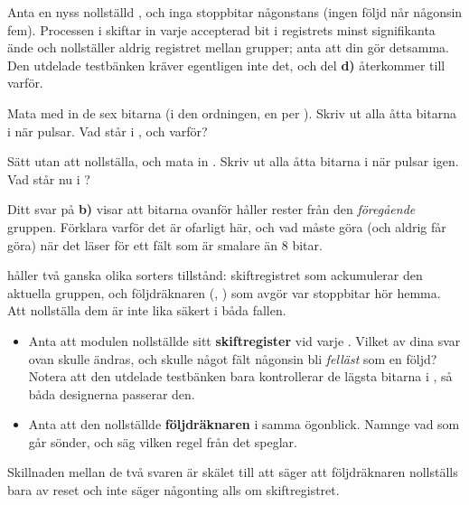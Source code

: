 Anta en nyss nollställd ,  och inga stoppbitar någonstans
(ingen följd når någonsin fem). Processen i  skiftar in varje accepterad bit
i registrets minst signifikanta ände och nollställer aldrig registret mellan grupper; anta att din
gör detsamma. Den utdelade testbänken kräver egentligen inte det, och del \textbf{d)} återkommer
till varför.

 Mata med  in de sex bitarna  (i den ordningen, en per
). Skriv ut alla åtta bitarna i  när  pulsar. Vad står i
, och varför?

 Sätt  utan att nollställa, och mata in . Skriv ut alla åtta
bitarna i  när  pulsar igen. Vad står nu i ?

 Ditt svar på \textbf{b)} visar att bitarna ovanför  håller rester från den
\emph{föregående} gruppen. Förklara varför det är ofarligt här, och vad  måste
göra (och aldrig får göra) när det läser  för ett fält som är smalare än 8 bitar.

  håller två ganska olika sorters tillstånd: skiftregistret som
ackumulerar den aktuella gruppen, och följdräknaren (, ) som avgör
var stoppbitar hör hemma. Att nollställa dem är inte lika säkert i båda fallen.
\begin{itemize}
  \item Anta att modulen nollställde sitt \textbf{skiftregister} vid varje . Vilket av
    dina svar ovan skulle ändras, och skulle något fält någonsin bli \emph{felläst} som en följd?
    Notera att den utdelade testbänken bara kontrollerar de lägsta  bitarna i
    , så båda designerna passerar den.
  \item Anta att den nollställde \textbf{följdräknaren} i samma ögonblick. Namnge vad som går sönder,
    och säg vilken regel från  det speglar.
\end{itemize}

Skillnaden mellan de två svaren är skälet till att  säger att följdräknaren
nollställs bara av reset och inte säger någonting alls om skiftregistret.
